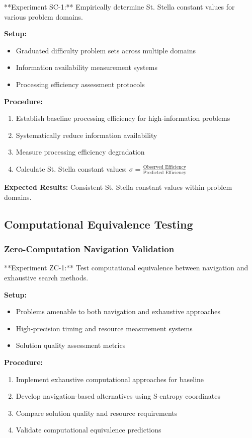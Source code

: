 \documentclass[11pt]{article}
\begin{document}
**Experiment SC-1:** Empirically determine St. Stella constant values for various problem domains.

\textbf{Setup:}
\begin{itemize}
\item Graduated difficulty problem sets across multiple domains
\item Information availability measurement systems
\item Processing efficiency assessment protocols
\end{itemize}

\textbf{Procedure:}
\begin{enumerate}
\item Establish baseline processing efficiency for high-information problems
\item Systematically reduce information availability
\item Measure processing efficiency degradation
\item Calculate St. Stella constant values: $\sigma = \frac{\text{Observed Efficiency}}{\text{Predicted Efficiency}}$
\end{enumerate}

\textbf{Expected Results:} Consistent St. Stella constant values within problem domains.

\subsection{Computational Equivalence Testing}

\subsubsection{Zero-Computation Navigation Validation}

**Experiment ZC-1:** Test computational equivalence between navigation and exhaustive search methods.

\textbf{Setup:}
\begin{itemize}
\item Problems amenable to both navigation and exhaustive approaches
\item High-precision timing and resource measurement systems
\item Solution quality assessment metrics
\end{itemize}

\textbf{Procedure:}
\begin{enumerate}
\item Implement exhaustive computational approaches for baseline
\item Develop navigation-based alternatives using S-entropy coordinates
\item Compare solution quality and resource requirements
\item Validate computational equivalence predictions
\end{enumerate}
\end{document}
